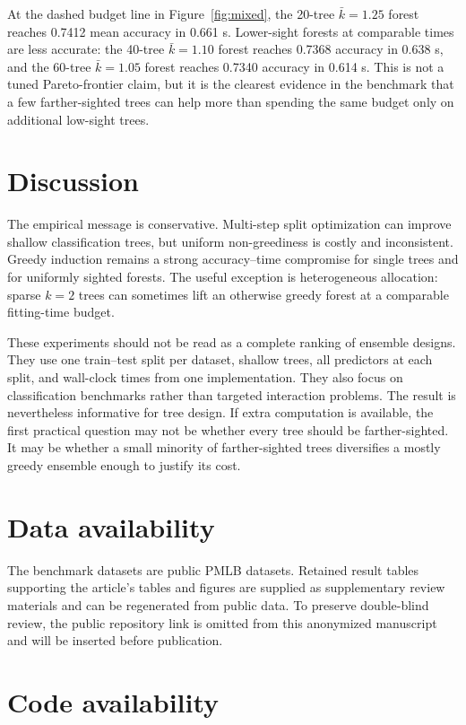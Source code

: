 \documentclass[12pt]{article}
\begin{document}
At the dashed budget line in Figure~\ref{fig:mixed}, the 20-tree $\bar{k}=1.25$ forest reaches 0.7412 mean accuracy in 0.661 s. Lower-sight forests at comparable times are less accurate: the 40-tree $\bar{k}=1.10$ forest reaches 0.7368 accuracy in 0.638 s, and the 60-tree $\bar{k}=1.05$ forest reaches 0.7340 accuracy in 0.614 s. This is not a tuned Pareto-frontier claim, but it is the clearest evidence in the benchmark that a few farther-sighted trees can help more than spending the same budget only on additional low-sight trees.

\section{Discussion}

The empirical message is conservative. Multi-step split optimization can improve shallow classification trees, but uniform non-greediness is costly and inconsistent. Greedy induction remains a strong accuracy--time compromise for single trees and for uniformly sighted forests. The useful exception is heterogeneous allocation: sparse $k=2$ trees can sometimes lift an otherwise greedy forest at a comparable fitting-time budget.

These experiments should not be read as a complete ranking of ensemble designs. They use one train--test split per dataset, shallow trees, all predictors at each split, and wall-clock times from one implementation. They also focus on classification benchmarks rather than targeted interaction problems. The result is nevertheless informative for tree design. If extra computation is available, the first practical question may not be whether every tree should be farther-sighted. It may be whether a small minority of farther-sighted trees diversifies a mostly greedy ensemble enough to justify its cost.

\section{Data availability}

The benchmark datasets are public PMLB datasets. Retained result tables supporting the article's tables and figures are supplied as supplementary review materials and can be regenerated from public data. To preserve double-blind review, the public repository link is omitted from this anonymized manuscript and will be inserted before publication.

\section{Code availability}
\end{document}
